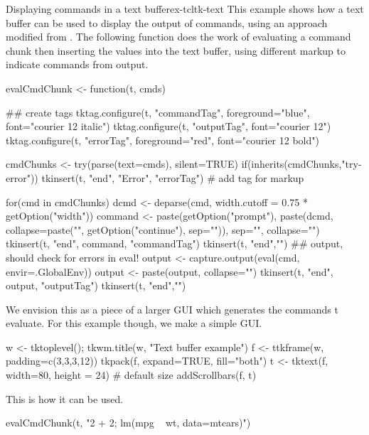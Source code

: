 \begin{example}{Displaying commands in a text buffer}{ex-tcltk-text}
This example shows how a text buffer can be used to display the output
of \R\/ commands, using an approach modified from . The
following function does the work of evaluating a command chunk then
inserting the values into the text buffer, using different markup to
indicate commands from output.

\begin{Schunk}
\begin{Sinput}
 evalCmdChunk <- function(t, cmds) {
   ## create tags
   tktag.configure(t, "commandTag", foreground="blue", 
                   font="courier 12 italic")
   tktag.configure(t, "outputTag", font="courier 12")
   tktag.configure(t, "errorTag", foreground="red", 
                   font="courier 12 bold")
 
   cmdChunks <- try(parse(text=cmds), silent=TRUE)
   if(inherits(cmdChunks,"try-error")) {
     tkinsert(t, "end", "Error", "errorTag") # add tag for markup
   }
 
   for(cmd in cmdChunks) {
     dcmd <- deparse(cmd, width.cutoff = 0.75 * getOption("width"))
     command <- 
       paste(getOption("prompt"),
             paste(dcmd, collapse=paste("\n", getOption("continue"), 
                           sep="")),
             sep="", collapse="")
     tkinsert(t, "end", command, "commandTag")
     tkinsert(t, "end","\n")
     ## output, should check for errors in eval!
     output <- capture.output(eval(cmd, envir=.GlobalEnv))
     output <- paste(output, collapse="\n")
     tkinsert(t, "end", output, "outputTag")
     tkinsert(t, "end","\n")
   }
 }
\end{Sinput}
\end{Schunk}


We envision this as a piece of a larger GUI which generates the
commands t evaluate. For this example though, we make a simple GUI.

\begin{Schunk}
\begin{Sinput}
 w <- tktoplevel(); tkwm.title(w, "Text buffer example")
 f <- ttkframe(w, padding=c(3,3,3,12))
 tkpack(f, expand=TRUE, fill="both")
 t <- tktext(f, width=80, height = 24)   # default size
 addScrollbars(f, t)
\end{Sinput}
\end{Schunk}
 
This is how it can be used.
\begin{Schunk}
\begin{Sinput}
 evalCmdChunk(t, "2 + 2; lm(mpg ~ wt, data=mtcars)")
\end{Sinput}
\end{Schunk}
\end{example}


